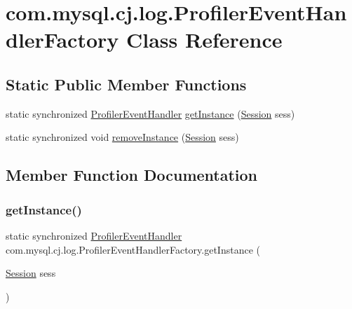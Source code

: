 \hypertarget{classcom_1_1mysql_1_1cj_1_1log_1_1_profiler_event_handler_factory}{}\section{com.\+mysql.\+cj.\+log.\+Profiler\+Event\+Handler\+Factory Class Reference}
\label{classcom_1_1mysql_1_1cj_1_1log_1_1_profiler_event_handler_factory}
\subsection*{Static Public Member Functions}
\begin{DoxyCompactItemize}
\item 
static synchronized \mbox{\hyperlink{interfacecom_1_1mysql_1_1cj_1_1log_1_1_profiler_event_handler}{Profiler\+Event\+Handler}} \mbox{\hyperlink{classcom_1_1mysql_1_1cj_1_1log_1_1_profiler_event_handler_factory_a9c843787773e7e7f942ee7b658105121}{get\+Instance}} (\mbox{\hyperlink{interfacecom_1_1mysql_1_1cj_1_1_session}{Session}} sess)
\item 
static synchronized void \mbox{\hyperlink{classcom_1_1mysql_1_1cj_1_1log_1_1_profiler_event_handler_factory_a85c30a6754e18d4debf2888a28c20ee2}{remove\+Instance}} (\mbox{\hyperlink{interfacecom_1_1mysql_1_1cj_1_1_session}{Session}} sess)
\end{DoxyCompactItemize}


\subsection{Member Function Documentation}
\mbox{\label{classcom_1_1mysql_1_1cj_1_1log_1_1_profiler_event_handler_factory_a9c843787773e7e7f942ee7b658105121}} 
\subsubsection{\texorpdfstring{get\+Instance()}{getInstance()}}
{\footnotesize\ttfamily static synchronized \mbox{\hyperlink{interfacecom_1_1mysql_1_1cj_1_1log_1_1_profiler_event_handler}{Profiler\+Event\+Handler}} com.\+mysql.\+cj.\+log.\+Profiler\+Event\+Handler\+Factory.\+get\+Instance (\begin{DoxyParamCaption}\item[{\mbox{\hyperlink{interfacecom_1_1mysql_1_1cj_1_1_session}{Session}}}]{sess }\end{DoxyParamCaption})\hspace{0.3cm}{\ttfamily [static]}}

